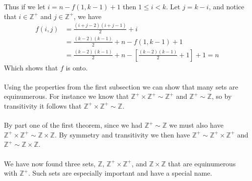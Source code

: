 \documentclass{report}
\theoremstyle{definition}
\begin{document}
Thus if we let $i=n-f(1,k-1)+1$ then $1\leq i<k$.
Let $j=k-i$, and notice that $i\in\mathbb Z^+$ and $j\in\mathbb Z^+$, we have
\begin{align*}
f(i,j)&=\frac{(i+j-2)(i+j-1)}{2}+i\\
&=\frac{(k-2)(k-1)}{2}+n-f(1,k-1)+1\\
&=\frac{(k-2)(k-1)}{2}+n-\left[\frac{(k-2)(k-1)}{2}+1\right]+1=n
\end{align*}
Which shows that $f$ is onto.\\
\vspace{1mm}\\
Using the properties from the first subsection we can show that many sets are equinumerous. For instance we know that $\mathbb Z^+\times\mathbb Z^+\sim\mathbb Z^+$ and 
$\mathbb Z^+\sim\mathbb Z$, so by transitivity it follows that
$\mathbb Z^+\times\mathbb Z^+\sim\mathbb Z$.\\
\vspace{1mm}\\
By part one of the first theorem, since we had 
$\mathbb Z^+\sim\mathbb Z$ we must also have
$\mathbb Z^+\times\mathbb Z^+\sim\mathbb Z\times\mathbb Z$. By symmetry and transitivity we then have 
$\mathbb Z^+\sim\mathbb Z^+\times\mathbb Z^+$ and 
$\mathbb Z^+\sim\mathbb Z\times\mathbb Z$.\\
\vspace{1mm}\\
We have now found three sets, $\mathbb Z$, $\mathbb Z^+\times\mathbb Z^+$, and $\mathbb Z\times\mathbb Z$ that 
are equinumerous with $\mathbb Z^+$. Such sets are
especially important and have a special name.
\newpage
\end{document}
